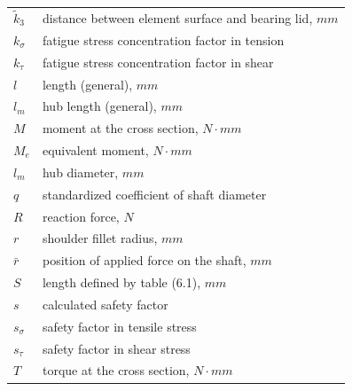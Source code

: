 \begin{tabular}[t]{lp{6.5cm}}
	$ \tilde{k}_3 $ & distance between element surface and bearing lid, $ \unit{mm} $\\
	$ k_\sigma $ & fatigue stress concentration factor in tension\\
	$ k_\tau $ & fatigue stress concentration factor in shear\\
	$ l $ & length (general), $ \unit{mm} $\\
	$ l_m $ & hub length (general), $ \unit{mm} $\\
	$ M $ & moment at the cross section, $ \unit{N\cdot mm} $\\
	$ M_e $ & equivalent moment, $ \unit{N\cdot mm} $\\
	$ l_m $ & hub diameter, $ \unit{mm} $\\
	$ q $ & standardized coefficient of shaft diameter\\
	$ R $ & reaction force, $ \unit{N} $\\
	$ r $ & shoulder fillet radius, $ \unit{mm} $\\
	$ \bar{r} $ & position of applied force on the shaft, $\unit{mm}$\\
	$ S $ & length defined by table (6.1), $ \unit{mm} $\\
	$ s $ & calculated safety factor\\
	$ s_\sigma $ & safety factor in tensile stress\\
	$ s_\tau $ & safety factor in shear stress\\
	$ T $ & torque at the cross section, $ \unit{N\cdot mm} $\\
\end{tabular}

